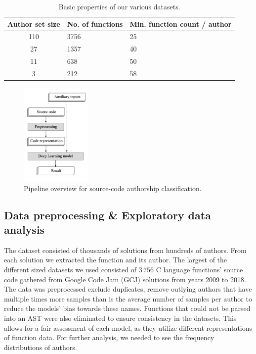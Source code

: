 \documentclass[conference]{IEEEtran}
\begin{document}
\begin{table}[!b]
    \centering
    \caption{Basic properties of our various datasets.}
    \label{tab:basic_props} %
    \begin{tabular}{|c|l|l|}
        \hline
        \textbf{Author set size} & \textbf{No. of functions} & \textbf{Min. function count / author} \\ 
        \hline
        110 & 3756 & 25 \\ 
        \hline
        27 & 1357 & 40 \\ 
        \hline
        11 & 638 & 50 \\ 
        \hline
        3 & 212 & 58 \\ 
        \hline
    \end{tabular}
\end{table}

\begin{figure}[!b]
    \centering
    \includegraphics[width=3.5cm,height=5cm]{figures/high_level_prediciton_task.png}
    \caption{\citet{compiler_based} Pipeline overview for source-code authorship classification.}

    \label{fig:predictive_task}
\end{figure}   
    

\subsection{Data preprocessing \& Exploratory data analysis}
The dataset consisted of thousands of solutions from hundreds of authors. From each solution we extracted the function and its author.
The largest of the different sized datasets we used consisted of $3\,756$ C language functions' source code gathered from Google Code Jam (GCJ) solutions from years 2009 to 2018. The data was preprocessed exclude duplicates, 
remove outlying authors that have multiple times more samples than is the average number of samples per author to reduce the models' bias towards these names. Functions 
that could not be parsed into an AST were also eliminated to ensure consistency in the datasets. This allows for a fair assessment of each model, 
as they utilize different representations of function data. For further analysis, we needed to see the frequency distributions of authors. 
\end{document}
